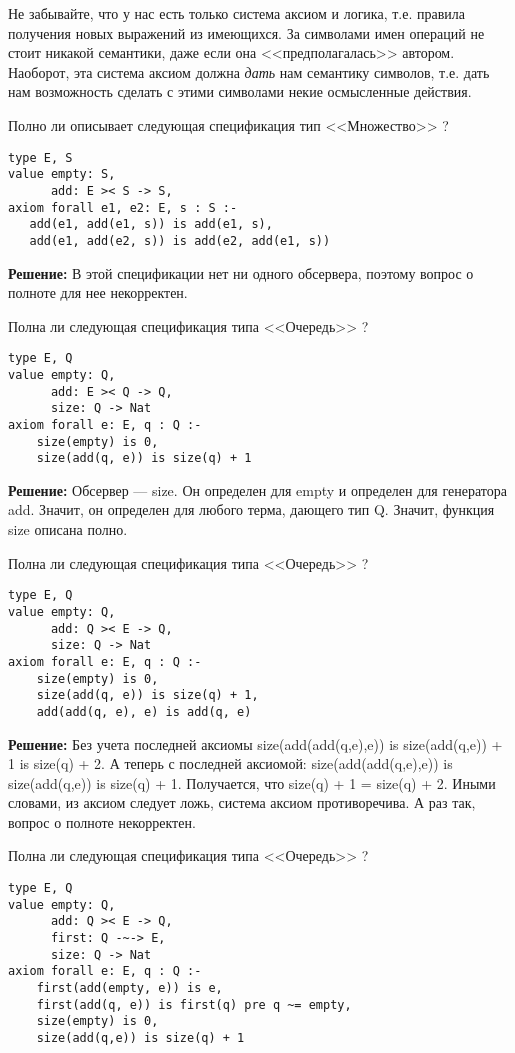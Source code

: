 
Не забывайте, что у нас есть только система аксиом и логика, т.е. правила получения новых выражений из имеющихся. За символами имен операций не стоит никакой семантики, даже если она <<предполагалась>> автором. Наоборот, эта система аксиом должна \emph{дать} нам семантику символов, т.е. дать нам возможность сделать с этими символами некие осмысленные действия.

\z Полно ли описывает следующая спецификация тип <<Множество>> ?
\begin{lstlisting}
type E, S
value empty: S,
      add: E >< S -> S,
axiom forall e1, e2: E, s : S :-
   add(e1, add(e1, s)) is add(e1, s),
   add(e1, add(e2, s)) is add(e2, add(e1, s))
\end{lstlisting}

\textbf{Решение:}
В этой спецификации нет ни одного обсервера, поэтому вопрос о полноте для нее некорректен.

\z Полна ли следующая спецификация типа <<Очередь>> ?
\begin{lstlisting}
type E, Q
value empty: Q,
      add: E >< Q -> Q,
      size: Q -> Nat
axiom forall e: E, q : Q :-
    size(empty) is 0,
    size(add(q, e)) is size(q) + 1
\end{lstlisting}

\textbf{Решение:}
Обсервер --- size. Он определен для empty и определен для генератора add. Значит, он определен для любого терма, дающего тип Q. Значит, функция size описана полно.

\z Полна ли следующая спецификация типа <<Очередь>> ?
\begin{lstlisting}
type E, Q
value empty: Q,
      add: Q >< E -> Q,
      size: Q -> Nat
axiom forall e: E, q : Q :-
    size(empty) is 0,
    size(add(q, e)) is size(q) + 1,
    add(add(q, e), e) is add(q, e)
\end{lstlisting}

\textbf{Решение:}
Без учета последней аксиомы size(add(add(q,e),e)) is size(add(q,e)) + 1 is size(q) + 2. А теперь с последней аксиомой: size(add(add(q,e),e)) is size(add(q,e)) is size(q) + 1. Получается, что size(q) + 1 = size(q) + 2. Иными словами, из аксиом следует ложь, система аксиом противоречива. А раз так, вопрос о полноте некорректен.


\z Полна ли следующая спецификация типа <<Очередь>> ?
\begin{lstlisting}
type E, Q
value empty: Q,
      add: Q >< E -> Q,
      first: Q -~-> E,
      size: Q -> Nat
axiom forall e: E, q : Q :-
    first(add(empty, e)) is e,
    first(add(q, e)) is first(q) pre q ~= empty,
    size(empty) is 0,
    size(add(q,e)) is size(q) + 1
\end{lstlisting}

